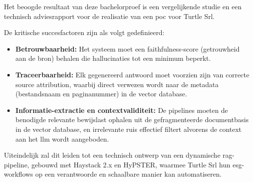 Het beoogde resultaat van deze bachelorproef is een vergelijkende studie en een technisch adviesrapport voor de realisatie van een \gls{poc} voor Turtle Srl.

De kritische succesfactoren zijn als volgt gedefinieerd:

\begin{itemize}
  \item \textbf{Betrouwbaarheid:} Het systeem moet een faithfulness-score (getrouwheid aan de bron) behalen die hallucinaties tot een minimum beperkt.
  \item \textbf{Traceerbaarheid:} Elk gegenereerd antwoord moet voorzien zijn van correcte source attribution, waarbij direct verwezen wordt naar de metadata (bestandsnaam en paginanummer) in de vector database.
  \item \textbf{Informatie-extractie en contextvaliditeit:} De pipelines moeten de benodigde relevante bewijslast ophalen uit de gefragmenteerde documentbasis in de vector database, en irrelevante ruis effectief filtert alvorens de context aan het \gls{llm} wordt aangeboden.
\end{itemize}

Uiteindelijk zal dit leiden tot een technisch ontwerp van een dynamische \gls{rag}-pipeline, gebouwd met Haystack 2.x en HyPSTER, waarmee Turtle Srl hun \gls{esg}-workflows op een verantwoorde en schaalbare manier kan automatiseren.

\section{}%
\label{sec:opzet-bachelorproef}

